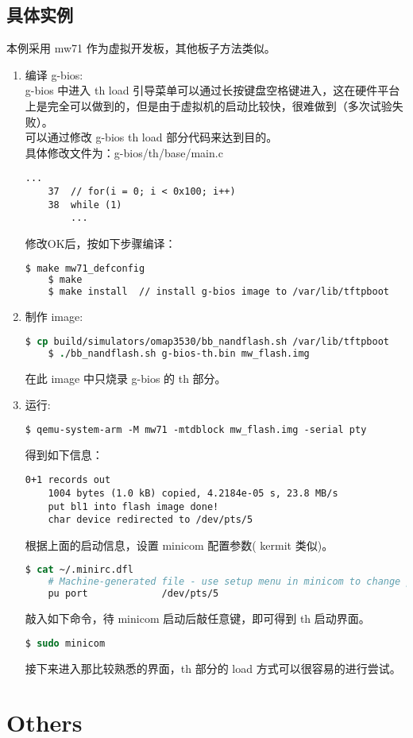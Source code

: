 \subsection{具体实例}
本例采用 mw71 作为虚拟开发板，其他板子方法类似。
\begin{enumerate}
	\item 编译 g-bios: \\
	g-bios 中进入 th load 引导菜单可以通过长按键盘空格键进入，这在硬件平台上是完全可以做到的，但是由于虚拟机的启动比较快，很难做到（多次试验失败）。\\
	可以通过修改 g-bios th load 部分代码来达到目的。\\
	具体修改文件为：g-bios/th/base/main.c
	\lstset{language=[ANSI]C}
	\begin{lstlisting}[numbers=none]
		...
	37	// for(i = 0; i < 0x100; i++)
	38	while (1)
		...
	\end{lstlisting}
	修改OK后，按如下步骤编译：
	\begin{lstlisting}[language=sh,numbers=none]
	$ make mw71_defconfig
	$ make
	$ make install  // install g-bios image to /var/lib/tftpboot
	\end{lstlisting}

	\item 制作 image:
	\begin{lstlisting}[language=csh,numbers=none]
	$ cp build/simulators/omap3530/bb_nandflash.sh /var/lib/tftpboot
	$ ./bb_nandflash.sh g-bios-th.bin mw_flash.img
	\end{lstlisting}
	在此 image 中只烧录 g-bios 的 th 部分。

	\item 运行:
	\begin{lstlisting}[language=csh,numbers=none]
	$ qemu-system-arm -M mw71 -mtdblock mw_flash.img -serial pty
	\end{lstlisting}
	得到如下信息：
	\begin{lstlisting}[numbers=none]
	0+1 records out
	1004 bytes (1.0 kB) copied, 4.2184e-05 s, 23.8 MB/s
	put bl1 into flash image done!
	char device redirected to /dev/pts/5
	\end{lstlisting}
	根据上面的启动信息，设置 minicom 配置参数( kermit 类似)。
	\begin{lstlisting}[language=csh,numbers=none]
	$ cat ~/.minirc.dfl
	# Machine-generated file - use setup menu in minicom to change parameters.
	pu port             /dev/pts/5
	\end{lstlisting}
	敲入如下命令，待 minicom 启动后敲任意键，即可得到 th 启动界面。
	\begin{lstlisting}[language=csh,numbers=none]
	$ sudo minicom
	\end{lstlisting}
	接下来进入那比较熟悉的界面，th 部分的 load 方式可以很容易的进行尝试。

\end{enumerate}

\section{Others}
